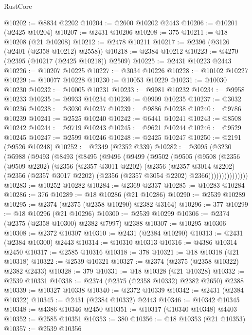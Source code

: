\begin{lexlean}{RustCore}
\begin{coremodule}
@10202 := @8834 @2202
@10204 := @2600 @10202 @2443
@10206 := @10201 (@2425 @10204)
@10207 := @2431 @10206
@10208 := 375
@10211 := @18 @10208 (@21 @10208)
@10212 := @2478 @10211
@10217 := @2396 (@3126 (@2401 (@2358 @10212) @2558))
@10218 := @2384 @10212
@10223 := @4270 (@2395 (@10217 (@2425 @10218)) @2509)
@10225 := @2431 @10223 @2443
@10226 := @10207 @10225
@10227 := @3034 @10226
@10228 := @10102 @10227
@10229 := @10077 @10228
@10230 := @10053 @10229
@10231 := @10030 @10230
@10232 := @10005 @10231
@10233 := @9981 @10232
@10234 := @9958 @10233
@10235 := @9933 @10234
@10236 := @9909 @10235
@10237 := @3032 @10236
@10238 := @3030 @10237
@10239 := @9886 @10238
@10240 := @9786 @10239
@10241 := @2525 @10240
@10242 := @6441 @10241
@10243 := @8508 @10242
@10244 := @9719 @10243
@10245 := @9621 @10244
@10246 := @9529 @10245
@10247 := @2599 @10246
@10248 := @2425 @10247
@10250 := @2191 (@9526 @10248)
@10252 := @2349 (@2352 @339)
@10282 := @3095
    (@3230
      (@5988
        (@9493
          (@8493
            (@8495
              (@9496
                (@9499
                  (@9502
                    (@9505
                      (@9508
                        (@2356
                          (@9509 @2202)
                          (@2356
                            (@2357 @3011 @2202)
                            (@2356
                              (@2357 @3014 @2202)
                              (@2356
                                (@2357 @3017 @2202)
                                (@2356 (@2357 @3054 @2202) @2366)))))))))))))))
@10283 := @10252 @10282
@10284 := @2369 @2337
@10285 := @10283 @10284
@10286 := 376
@10289 := @18 @10286 (@21 @10286)
@10290 := @2539 @10289
@10295 := @2374 (@2375 (@2358 @10290) @2382 @3164)
@10296 := 377
@10299 := @18 @10296 (@21 @10296)
@10300 := @2539 @10299
@10306 := @2374 (@2375 (@2358 @10300) @2382 @7997) @2388
@10307 := @10295 @10306
@10308 := @2372 @10307
@10310 := @2431 (@2384 @10290)
@10313 := @2431 (@2384 @10300) @2443
@10314 := @10310 @10313
@10316 := @4386 @10314 @2450
@10317 := @2585 @10316
@10318 := 378
@10321 := @18 @10318 (@21 @10318)
@10322 := @2539 @10321
@10327 := @2374 (@2375 (@2358 @10322) @2382 @2433)
@10328 := 379
@10331 := @18 @10328 (@21 @10328)
@10332 := @2539 @10331
@10338 := @2374 (@2375 (@2358 @10332) @2382 @2650) @2388
@10339 := @10327 @10338
@10340 := @2372 @10339
@10342 := @2431 (@2384 @10322)
@10345 := @2431 (@2384 @10332) @2443
@10346 := @10342 @10345
@10348 := @4386 @10346 @2450
@10351 := @10317 (@10340 @10348) @4403
@10352 := @2585 @10351
@10353 := 380
@10356 := @18 @10353 (@21 @10353)
@10357 := @2539 @10356

\end{coremodule}
\end{lexlean}
